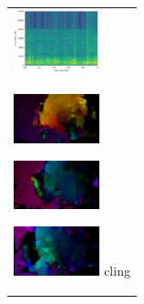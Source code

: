 \begin{figure}[H]
\begin{tabular}{l}
\begin{minipage}{0.165\hsize}
\begin{center}
        \end{center}
      \end{minipage}
      \begin{minipage}{0.165\hsize}
        \begin{center}
          \includegraphics[clip, width=2.5cm]{./Figures/sound_sniffcling.eps}
        \end{center}
      \end{minipage}
\\  %
      \begin{minipage}{0.165\hsize}
        \begin{center}
          \includegraphics[clip, width=2.5cm]{./Figures/optic_sniffcling1.eps}
          \hspace{0.3cm} { }
        \end{center}
      \end{minipage}
      \begin{minipage}{0.165\hsize}
        \begin{center}
          \includegraphics[clip, width=2.5cm]{./Figures/optic_sniffcling2.eps}
          \hspace{0.0cm} { }
        \end{center}
      \end{minipage}
      \begin{minipage}{0.165\hsize}
        \begin{center}
          \includegraphics[clip, width=2.5cm]{./Figures/optic_sniffcling3.eps}
          \hspace{0.0cm} {cling}
        \end{center}
      \end{minipage}
      \begin{minipage}{0.165\hsize}

\end{minipage}
\end{tabular}
\end{figure}
